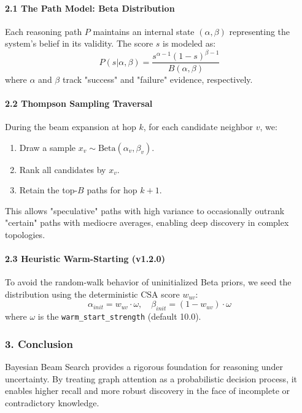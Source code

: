 \paragraph{2.1 The Path Model: Beta Distri\-bution}
Each reasoning path $P$ maintains an internal state $(\alpha, \beta)$ repre\-senting the system's belief in its validity. The score $s$ is modeled as:
\begin{equation}
P(s | \alpha, \beta) = \frac{s^{\alpha-1} (1-s)^{\beta-1}}{B(\alpha, \beta)}
\end{equation}
where $\alpha$ and $\beta$ track "success" and "failure" evidence, respe\-ctively.

\paragraph{2.2 Thompson Sampling Traversal}
During the beam expansion at hop $k$, for each candidate neighbor $v$, we:
\begin{enumerate}
\item Draw a sample $x_v \sim \text{Beta}(\alpha_v, \beta_v)$.
\item Rank all candidates by $x_v$.
\item Retain the top-$B$ paths for hop $k+1$.

\end{enumerate}
This allows "speculative" paths with high variance to occas\-ionally outrank "certain" paths with mediocre averages, enabling deep discovery in complex topologies.

\paragraph{2.3 Heuristic Warm-Starting (v1.2.0)}
To avoid the random-walk behavior of unini\-tialized Beta priors, we seed the distr\-ibution using the deter\-ministic CSA score $w_{uv}$:
\begin{equation}
\alpha_{init} = w_{uv} \cdot \omega, \quad \beta_{init} = (1-w_{uv}) \cdot \omega
\end{equation}
where $\omega$ is the \texttt{warm\_start\_strength} (default 10.0).

\subsubsection{3. Conclusion}
Bayesian Beam Search provides a rigorous foundation for reasoning under uncertainty. By treating graph attention as a proba\-bilistic decision process, it enables higher recall and more robust discovery in the face of incomplete or contr\-adictory knowledge.

